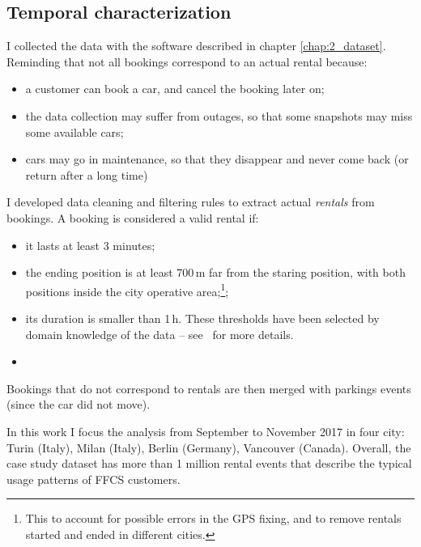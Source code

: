 \subsection{Temporal characterization}
I collected the data with the software described in chapter \ref{chap:2_dataset}. Reminding that not all bookings correspond to an actual rental because:
\begin{itemize}
	\item a customer can book a car, and cancel the booking later on;
	\item the data collection may suffer from outages, so that some snapshots may miss some available cars;
	\item cars may go in maintenance, so that they disappear and never come back (or return after a long time)
\end{itemize}
I developed data cleaning and filtering rules to extract actual \textit{rentals} from bookings. A booking is considered a valid rental if:
\begin{itemize}
	\item it lasts at least 3 minutes;
	\item the ending position is at least 700\,m far from the staring position, with both positions inside the city operative area;\footnote{This to account for possible errors in the GPS fixing, and to remove rentals started and ended in different cities.};
	\item its duration is smaller than 1\,h. These thresholds have been selected by domain knowledge of the data -- see~\cite{UMAP} for more details.
	\item {}
\end{itemize}
Bookings that do not correspond to rentals are then merged with parkings events (since the car did not move).


In this work I focus the analysis from September to November 2017 in four city: Turin (Italy), Milan (Italy), Berlin (Germany), Vancouver (Canada).
Overall, the case study dataset has more than 1 million rental events that describe the typical usage patterns of FFCS customers. 


